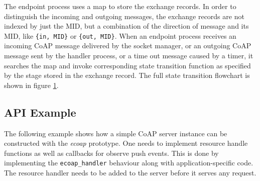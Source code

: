 The endpoint process uses a map to store the exchange records. In order to distinguish the incoming and outgoing messages, the exchange records are not indexed by just the MID, but a combination of the direction of message and its MID, like \verb|{in, MID}| or \verb|{out, MID}|. When an endpoint process receives an incoming CoAP message delivered by the socket manager, or an outgoing CoAP message sent by the handler process, or a time out message caused by a timer, it searches the map and invoke corresponding state transition function as specified by the stage stored in the exchange record. The full state transition flowchart is shown in figure \ref{fig:exchange_state_transition}.

\begin{figure}
\label{fig:exchange_state_transition}
\end{figure}

\subsection{API Example}\label{api_example}

The following example shows how a simple CoAP server instance can be constructed with the \textit{ecoap} prototype. One needs to implement resource handle functions as well as callbacks for observe push events. This is done by implementing the \verb|ecoap_handler| behaviour along with application-specific code. The resource handler needs to be added to the server before it serves any request.  

